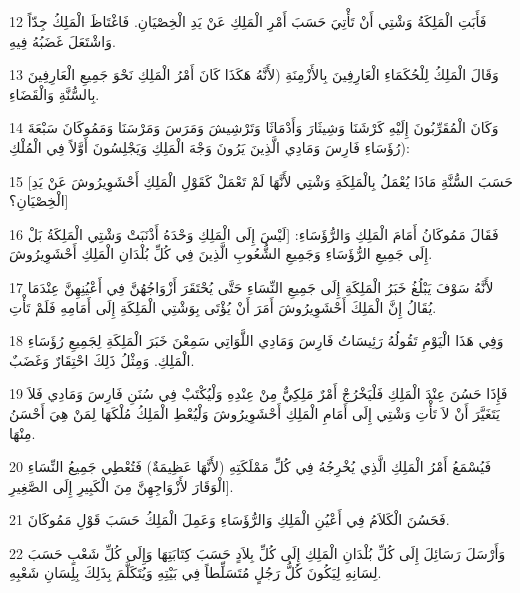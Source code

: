 \par 12 فَأَبَتِ الْمَلِكَةُ وَشْتِي أَنْ تَأْتِيَ حَسَبَ أَمْرِ الْمَلِكِ عَنْ يَدِ الْخِصْيَانِ. فَاغْتَاظَ الْمَلِكُ جِدّاً وَاشْتَعَلَ غَضَبُهُ فِيهِ.
\par 13 وَقَالَ الْمَلِكُ لِلْحُكَمَاءِ الْعَارِفِينَ بِالأَزْمِنَةِ (لأَنَّهُ هَكَذَا كَانَ أَمْرُ الْمَلِكِ نَحْوَ جَمِيعِ الْعَارِفِينَ بِالسُّنَّةِ وَالْقَضَاءِ.
\par 14 وَكَانَ الْمُقَرِّبُونَ إِلَيْهِ كَرْشَنَا وَشِيثَارَ وَأَدْمَاثَا وَتَرْشِيشَ وَمَرَسَ وَمَرْسَنَا وَمَمُوكَانَ سَبْعَةَ رُؤَسَاءِ فَارِسَ وَمَادِي الَّذِينَ يَرُونَ وَجْهَ الْمَلِكِ وَيَجْلِسُونَ أَوَّلاً فِي الْمُلْكِ):
\par 15 [حَسَبَ السُّنَّةِ مَاذَا يُعْمَلُ بِالْمَلِكَةِ وَشْتِي لأَنَّهَا لَمْ تَعْمَلْ كَقَوْلِ الْمَلِكِ أَحْشَوِيرُوشَ عَنْ يَدِ الْخِصْيَانِ؟]
\par 16 فَقَالَ مَمُوكَانُ أَمَامَ الْمَلِكِ وَالرُّؤَسَاءِ: [لَيْسَ إِلَى الْمَلِكِ وَحْدَهُ أَذْنَبَتْ وَشْتِي الْمَلِكَةُ بَلْ إِلَى جَمِيعِ الرُّؤَسَاءِ وَجَمِيعِ الشُّعُوبِ الَّذِينَ فِي كُلِّ بُلْدَانِ الْمَلِكِ أَحْشَوِيرُوشَ.
\par 17 لأَنَّهُ سَوْفَ يَبْلُغُ خَبَرُ الْمَلِكَةِ إِلَى جَمِيعِ النِّسَاءِ حَتَّى يُحْتَقَرَ أَزْوَاجُهُنَّ فِي أَعْيُنِهِنَّ عِنْدَمَا يُقَالُ إِنَّ الْمَلِكَ أَحْشَوِيرُوشَ أَمَرَ أَنْ يُؤْتَى بِوَشْتِي الْمَلِكَةِ إِلَى أَمَامِهِ فَلَمْ تَأْتِ.
\par 18 وَفِي هَذَا الْيَوْمِ تَقُولُهُ رَئِيسَاتُ فَارِسَ وَمَادِي اللَّوَاتِي سَمِعْنَ خَبَرَ الْمَلِكَةِ لِجَمِيعِ رُؤَسَاءِ الْمَلِكِ. وَمِثْلُ ذَلِكَ احْتِقَارٌ وَغَضَبٌ.
\par 19 فَإِذَا حَسُنَ عِنْدَ الْمَلِكِ فَلْيَخْرُجْ أَمْرٌ مَلِكِيٌّ مِنْ عِنْدِهِ وَلْيُكْتَبْ فِي سُنَنِ فَارِسَ وَمَادِي فَلاَ يَتَغَيَّرَ أَنْ لاَ تَأْتِ وَشْتِي إِلَى أَمَامِ الْمَلِكِ أَحْشَوِيرُوشَ وَلْيُعْطِ الْمَلِكُ مُلْكَهَا لِمَنْ هِيَ أَحْسَنُ مِنْهَا.
\par 20 فَيُسْمَعُ أَمْرُ الْمَلِكِ الَّذِي يُخْرِجُهُ فِي كُلِّ مَمْلَكَتِهِ (لأَنَّهَا عَظِيمَةٌ) فَتُعْطِي جَمِيعُ النِّسَاءِ الْوَقَارَ لأَزْوَاجِهِنَّ مِنَ الْكَبِيرِ إِلَى الصَّغِيرِ].
\par 21 فَحَسُنَ الْكَلاَمُ فِي أَعْيُنِ الْمَلِكِ وَالرُّؤَسَاءِ وَعَمِلَ الْمَلِكُ حَسَبَ قَوْلِ مَمُوكَانَ.
\par 22 وَأَرْسَلَ رَسَائِلَ إِلَى كُلِّ بُلْدَانِ الْمَلِكِ إِلَى كُلِّ بِلاَدٍ حَسَبَ كِتَابَتِهَا وَإِلَى كُلِّ شَعْبٍ حَسَبَ لِسَانِهِ لِيَكُونَ كُلُّ رَجُلٍ مُتَسَلِّطاً فِي بَيْتِهِ وَيُتَكَلَّمَ بِذَلِكَ بِلِسَانِ شَعْبِهِ.

